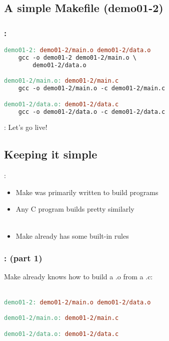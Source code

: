 \subsection{A simple Makefile (demo01-2)}
\begin{frame}[fragile]
    \frametitle{\secname: \small\subsecname\normalsize}

    \begin{lstlisting}[language=make]
demo01-2: demo01-2/main.o demo01-2/data.o
    gcc -o demo01-2 demo01-2/main.o \
        demo01-2/data.o

demo01-2/main.o: demo01-2/main.c
    gcc -o demo01-2/main.o -c demo01-2/main.c

demo01-2/data.o: demo01-2/data.c
    gcc -o demo01-2/data.o -c demo01-2/data.c
    \end{lstlisting}
\end{frame}

\begin{frame}{\secname: \small\subsecname\normalsize}
    Let's go live!

\end{frame}

\subsection{Keeping it simple}
\begin{frame}{\secname: \small\subsecname\normalsize}
    \begin{itemize}
        \item Make was primarily written to build programs
        \item Any C program builds pretty similarly \\~\\ \pause
        \item Make already has some built-in rules
    \end{itemize}
\end{frame}

\begin{frame}[fragile]
    \frametitle{\secname: \small\subsecname (part 1)\normalsize}

    Make already knows how to build a .o from a .c: \\~\\

    \begin{lstlisting}[language=make]
demo01-2: demo01-2/main.o demo01-2/data.o

demo01-2/main.o: demo01-2/main.c

demo01-2/data.o: demo01-2/data.c
    \end{lstlisting}
\end{frame}

